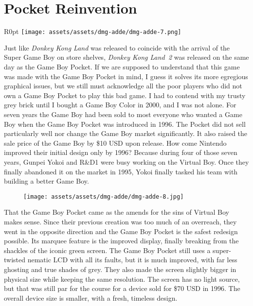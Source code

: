 \documentclass{book}
\begin{document}
\FloatBarrier\needspace{10mm}\section*{Pocket Reinvention}\nopagebreak[4]

\begin{wrapfigure}{R}{0pt} \texttt{[image: assets/assets/dmg-adde/dmg-adde-7.png]}\end{wrapfigure}
Just like \emph{Donkey Kong Land} was released to coincide with the arrival of the Super Game Boy on store shelves, \emph{Donkey Kong Land 2} was released on the same day as the Game Boy Pocket. If we are supposed to understand that this game was made with the Game Boy Pocket in mind, I guess it solves its more egregious graphical issues, but we still must acknowledge all the poor players who did not own a Game Boy Pocket to play this bad game. I had to contend with my trusty grey brick until I bought a Game Boy Color in 2000, and I was not alone. For seven years the Game Boy had been sold to most everyone who wanted a Game Boy when the Game Boy Pocket was introduced in 1996. The Pocket did not sell particularly well nor change the Game Boy market significantly. It also raised the sale price of the Game Boy by \$10 USD upon release. How come Nintendo improved their initial design only by 1996? Because during four of those seven years, Gunpei Yokoi and R\&D1 were busy working on the Virtual Boy. Once they finally abandoned it on the market in 1995, Yokoi finally tasked his team with building a better Game Boy.

\begin{figure}[hbt]
\vskip 10pt
\centering \texttt{[image: assets/assets/dmg-adde/dmg-adde-8.jpg]}
\vskip 6pt
\end{figure}
That the Game Boy Pocket came as the amends for the sins of Virtual Boy makes sense. Since their previous creation was too much of an overreach, they went in the opposite direction and the Game Boy Pocket is the safest redesign possible. Its marquee feature is the improved display, finally breaking from the shackles of the iconic green screen. The Game Boy Pocket still uses a super-twisted nematic LCD with all its faults, but it is much improved, with far less ghosting and true shades of grey. They also made the screen slightly bigger in physical size while keeping the same resolution. The screen has no light source, but that was still par for the course for a device sold for \$70 USD in 1996. The overall device size is smaller, with a fresh, timeless design.
\end{document}
